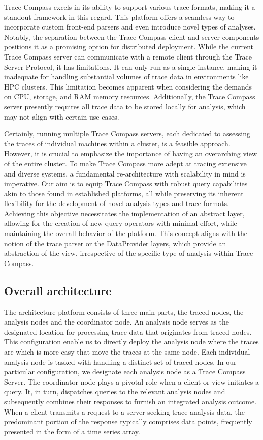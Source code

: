 Trace Compass excels in its ability to support various trace formats, making it a standout framework in this regard. This platform offers a seamless way to incorporate custom front-end parsers and even introduce novel types of analyses. Notably, the separation between the Trace Compass client and server components positions it as a promising option for distributed deployment. While the current Trace Compass server can communicate with a remote client through the Trace Server Protocol, it has limitations. It can only run as a single instance, making it inadequate for handling substantial volumes of trace data in environments like HPC clusters. This limitation becomes apparent when considering the demands on CPU, storage, and RAM memory resources. Additionally, the Trace Compass server presently requires all trace data to be stored locally for analysis, which may not align with certain use cases.

Certainly, running multiple Trace Compass servers, each dedicated to assessing the traces of individual machines within a cluster, is a feasible approach. However, it is crucial to emphasize the importance of having an overarching view of the entire cluster. To make Trace Compass more adept at tracing extensive and diverse systems, a fundamental re-architecture with scalability in mind is imperative. Our aim is to equip Trace Compass with robust query capabilities akin to those found in established platforms, all while preserving its inherent flexibility for the development of novel analysis types and trace formats. Achieving this objective necessitates the implementation of an abstract layer, allowing for the creation of new query operators with minimal effort, while maintaining the overall behavior of the platform. This concept aligns with the notion of the trace parser or the DataProvider layers, which provide an abstraction of the view, irrespective of the specific type of analysis within Trace Compass.


\subsection{Overall architecture}

The architecture platform consists of three main parts, the traced nodes, the analysis nodes and the coordinator node. An analysis node serves as the designated location for processing trace data that originates from traced nodes. This configuration enable us to directly deploy the analysis node where the traces are which is more easy that move the traces at the same node. Each individual analysis node is tasked with handling a distinct set of traced nodes. In our particular configuration, we designate each analysis node as a Trace Compass Server. The coordinator node plays a pivotal role when a client or view initiates a query. It, in turn, dispatches queries to the relevant analysis nodes and subsequently combines their responses to furnish an integrated analysis outcome. When a client transmits a request to a server seeking trace analysis data, the predominant portion of the response typically comprises data points, frequently presented in the form of a time series array.

